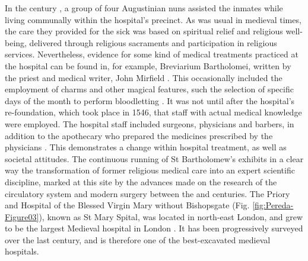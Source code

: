 \documentclass[%
	]{ijsra}
\begin{document}
In the  century \AD, a group of four Augustinian nuns assisted the inmates while living communally within the hospital’s precinct. As was usual in medieval times, the care they provided for the sick was based on spiritual relief and religious well-being, delivered through religious sacraments and participation in religious services. 
Nevertheless, evidence for some kind of medical treatments practiced at the hospital can be found in, for example, Breviarium Bartholomei, written by the priest and medical writer, John Mirfield \parencite[36-37]{Dainton_1961}. 
This occasionally included the employment of charms and other magical features, such the selection of specific days of the month to perform bloodletting \parencite[35-36]{Rider_2012}. 
It was not until after the hospital’s re-foundation, which took place in 1546, that staff with actual medical knowledge were employed. The hospital staff included surgeons, physicians and barbers, in addition to the apothecary who prepared the medicines prescribed by the physicians \parencite[38-39]{Dainton_1961}. This demonstrates a change within hospital treatment, as well as societal attitudes.  
The continuous running of St Bartholomew’s exhibits in a clear way the transformation of former religious medical care into an expert scientific discipline, marked at this site by the advances made on the research of the circulatory system and modern surgery between the  and  centuries.
\IJSRAseparator
{}
The Priory and Hospital of the Blessed Virgin Mary without Bishopsgate (Fig. \ref{fig:Pereda-Figure03}), %
known as St Mary Spital, was located in north-east London, and grew to be the largest Medieval hospital in London \parencite[60]{Bowers_2007}. It has been progressively surveyed over the last century, and is therefore one of the best-excavated medieval hospitals. 
\end{document}
